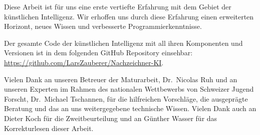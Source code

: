 Diese Arbeit ist für uns eine erste vertiefte Erfahrung mit dem Gebiet der
künstlichen Intelligenz. Wir erhoffen uns durch diese Erfahrung einen
erweiterten Horizont, neues Wissen und verbesserte Programmierkenntnisse.

Der gesamte Code der künstlichen Intelligenz mit all ihren Komponenten und Versionen ist in dem folgenden
GitHub Repository einsehbar:
\url{https://github.com/LarsZauberer/Nachzeichner-KI}.

    
Vielen Dank an unseren Betreuer der Maturarbeit, Dr.\ Nicolas Ruh und an unseren
Experten im Rahmen des nationalen Wettbewerbs von Schweizer Jugend Forscht, Dr.\
Michael Tschannen, für die hilfreichen Vorschläge, die ausgeprägte Beratung und
das an uns weitergegebene technische Wissen. Vielen Dank auch an Dieter Koch für
die Zweitbeurteilung und an Günther Wasser für das Korrekturlesen dieser Arbeit.

